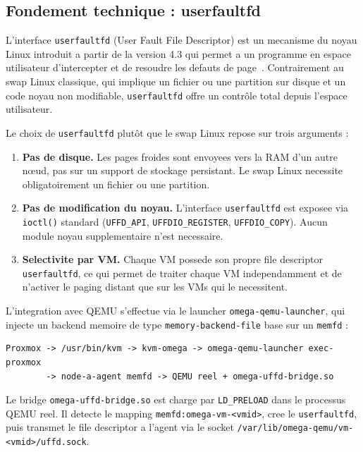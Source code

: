 \subsection{Fondement technique : userfaultfd}
\label{subsec:userfaultfd}

L'interface \texttt{userfaultfd} (User Fault File Descriptor) est un mecanisme du noyau Linux introduit a partir de la version 4.3 qui permet a un programme en espace utilisateur d'intercepter et de resoudre les defauts de page~\cite{userfaultfd_man}. Contrairement au swap Linux classique, qui implique un fichier ou une partition sur disque et un code noyau non modifiable, \texttt{userfaultfd} offre un contrôle total depuis l'espace utilisateur.

Le choix de \texttt{userfaultfd} plut\^ot que le swap Linux repose sur trois arguments :

\begin{enumerate}
    \item \textbf{Pas de disque.} Les pages froides sont envoyees vers la RAM d'un autre nœud, pas sur un support de stockage persistant. Le swap Linux necessite obligatoirement un fichier ou une partition.
    \item \textbf{Pas de modification du noyau.} L'interface \texttt{userfaultfd} est exposee via \texttt{ioctl()} standard (\texttt{UFFD\_API}, \texttt{UFFDIO\_REGISTER}, \texttt{UFFDIO\_COPY}). Aucun module noyau supplementaire n'est necessaire.
    \item \textbf{Selectivite par VM.} Chaque VM possede son propre file descriptor \texttt{userfaultfd}, ce qui permet de traiter chaque VM independamment et de n'activer le paging distant que sur les VMs qui le necessitent.
\end{enumerate}

L'integration avec QEMU s'effectue via le launcher \texttt{omega-qemu-launcher}, qui injecte un backend memoire de type \texttt{memory-backend-file} base sur un \texttt{memfd} :

\begin{verbatim}
Proxmox -> /usr/bin/kvm -> kvm-omega -> omega-qemu-launcher exec-proxmox
        -> node-a-agent memfd -> QEMU reel + omega-uffd-bridge.so
\end{verbatim}

Le bridge \texttt{omega-uffd-bridge.so} est charge par \texttt{LD\_PRELOAD} dans le processus QEMU reel. Il detecte le mapping \texttt{memfd:omega-vm-<vmid>}, cree le \texttt{userfaultfd}, puis transmet le file descriptor a l'agent via le socket \texttt{/var/lib/omega-qemu/vm-<vmid>/uffd.sock}.


